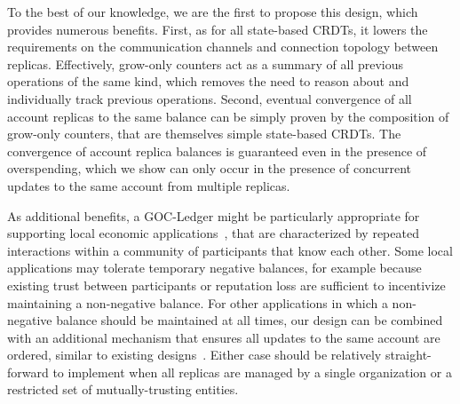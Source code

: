 \documentclass[9pt]{article}   	%
\begin{document}
To the best of our knowledge, we are the first to propose this design, which provides numerous benefits. First, as for all state-based CRDTs, it lowers the requirements on the communication channels and connection topology between replicas. Effectively, grow-only counters act as a summary of all previous operations of the same kind, which removes the need to reason about and individually track previous operations. Second, eventual convergence of all account replicas to the same balance can be simply proven by the composition of grow-only counters, that are themselves simple state-based CRDTs. The convergence of account replica balances is guaranteed even in the presence of overspending, which we show can only occur in the presence of concurrent updates to the same account from multiple replicas.


As additional benefits, a GOC-Ledger might be particularly appropriate for supporting local economic applications~\cite{lavoie2022localcryptotokens}, that are characterized by repeated interactions within a community of participants that know each other. Some local applications may tolerate temporary negative balances, for example because existing trust between participants or reputation loss are sufficient to incentivize maintaining a non-negative balance. For other applications in which a non-negative balance should be maintained at all times, our design can be combined with an additional mechanism that ensures all updates to the same account are ordered, similar to existing designs~\cite{collins2020broadcast-payment,baudet2020fastpay}. Either case should be relatively straight-forward to implement when all replicas are managed by a single organization or a restricted set of mutually-trusting entities.
\end{document}
